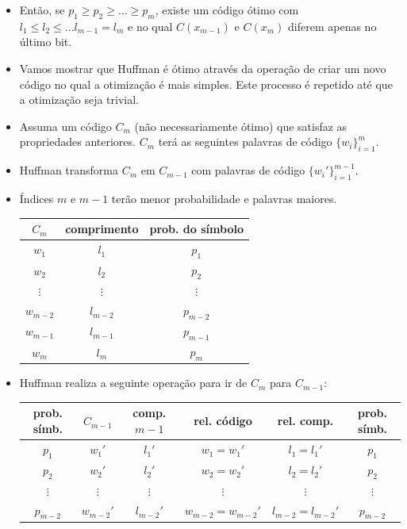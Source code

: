 \begin{frame}[allowframebreaks]
  \begin{itemize}
  \item Então, se $p_1 \geq p_2 \geq \ldots \geq p_m$, existe um código ótimo com $l_1 \leq l_2 \leq \ldots l_{m-1} = l_m$
	e no qual $C(x_{m-1})$ e $C(x_m)$ diferem apenas no último bit.
  \item Vamos mostrar que Huffman é ótimo através da operação de criar um novo código no qual a otimização é mais simples.
	Este processo é repetido até que a otimização seja trivial.
  \item Assuma um código $C_m$ (não necessariamente ótimo) que satisfaz as propriedades anteriores.
	$C_m$ terá as seguintes palavras de código $\{w_i\}_{i=1}^m$.
  \item Huffman transforma $C_m$ em $C_{m-1}$ com palavras de código $\{w_i'\}_{i=1}^{m-1}$.
  \item Índices $m$ e $m-1$ terão menor probabilidade e palavras maiores.
	\begin{tabular}{ccc}
	$C_m$ & comprimento & prob. do símbolo \\ \hline
	$w_1$ & $l_1$ & $p_1$ \\
	$w_2$ & $l_2$ & $p_2$ \\
	$\vdots$ & $\vdots$ & $\vdots$ \\
	$w_{m-2}$ & $l_{m-2}$ & $p_{m-2}$ \\
	$w_{m-1}$ & $l_{m-1}$ & $p_{m-1}$ \\
	$w_{m}$ & $l_{m}$ & $p_{m}$ \\
	\end{tabular}
  \end{itemize}
  \framebreak
  \begin{itemize} 
  \item Huffman realiza a seguinte operação para ir de $C_m$ para $C_{m-1}$:
 	\begin{tabular}{cccccc}
	\scriptsize{prob. símb.} & $C_{m-1}$ & \scriptsize{comp.} $m-1$ & \scriptsize{rel. código} & \scriptsize{rel. comp.} & \scriptsize{prob. símb.} \\ \hline
	$p_1$	& $w_1'$	& $l_1'$	& $w_1 = w_1'$ 	& $l_1 = l_1'$ 	& $p_1$ \\
	$p_2$   & $w_2'$        & $l_2'$        & $w_2 = w_2'$  & $l_2 = l_2'$  & $p_2$ \\
	$\vdots$ & $\vdots$ & $\vdots$ & $\vdots$ & $\vdots$ & $\vdots$ \\
	$p_{m-2}$   & $w_{m-2}'$        & $l_{m-2}'$        & $w_{m-2} = w_{m-2}'$  & $l_{m-2} = l_{m-2}'$  & $p_{m-2}$ \\

\end{tabular}
\end{itemize}
\end{frame}
